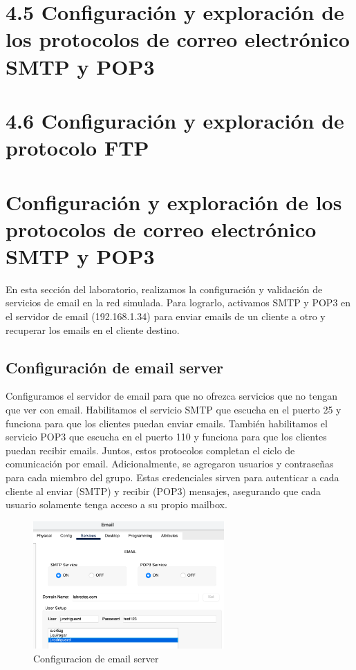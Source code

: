 \documentclass[10pt]{article}
\begin{document}
\section{4.5 Configuración y exploración de los protocolos de correo electrónico SMTP y POP3}
\section{4.6 Configuración y exploración de protocolo FTP}
\section{Configuración y exploración de los protocolos de correo electrónico SMTP y POP3}
En esta sección del laboratorio, realizamos la configuración y validación de servicios de email en la red simulada. Para lograrlo, activamos SMTP y POP3 en el servidor de email (192.168.1.34) para enviar emails de un cliente a otro y recuperar los emails en el cliente destino.
\subsection{Configuración de email server}
Configuramos el servidor de email para que no ofrezca servicios que no tengan que ver con email. Habilitamos el servicio SMTP que escucha en el puerto 25 y funciona para que los clientes puedan enviar emails. También habilitamos el servicio POP3 que escucha en el puerto 110 y funciona para que los clientes puedan recibir emails. Juntos, estos protocolos completan el ciclo de comunicación por email. Adicionalmente, se agregaron usuarios y contraseñas para cada miembro del grupo. Estas credenciales sirven para autenticar a cada cliente al enviar (SMTP) y recibir (POP3) mensajes, asegurando que cada usuario solamente tenga acceso a su propio mailbox.


\begin{figure}[H]
    \centering
    \includegraphics[width=0.65\textwidth]{lab-01-screenshots/45-1-email-config.png}
    \caption{Configuracion de email server}
\end{figure}
\end{document}
